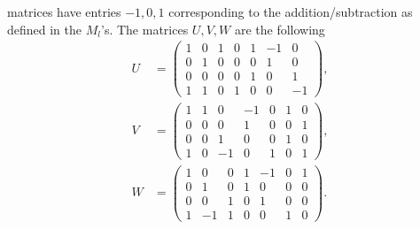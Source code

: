\documentclass[a4paper]{article}
\begin{document}
matrices have entries $-1, 0, 1$ corresponding to the addition/subtraction as
defined in the $M_l$'s. The matrices $U, V, W$ are the following
\begin{align}
    U &=
    \begin{pmatrix}
        1 & 0 & 1 & 0 & 1 & -1 & 0 \\
        0 & 1 & 0 & 0 & 0 & 1 & 0 \\
        0 & 0 & 0 & 0 & 1 & 0 & 1 \\
        1 & 1 & 0 & 1 & 0 & 0 & -1
    \end{pmatrix},\\
    V &=
    \begin{pmatrix}
        1 & 1 & 0 & -1 & 0 & 1 & 0\\
        0 & 0 & 0 & 1 & 0 & 0 & 1\\
        0 & 0 & 1 & 0 & 0 & 1 & 0\\
        1 & 0 & -1 & 0 & 1 & 0 & 1
    \end{pmatrix},\\
    W &=
    \begin{pmatrix}
        1 & 0 & 0 & 1 & -1 & 0 & 1\\
        0 & 1 & 0 & 1 & 0 & 0 & 0\\
        0 & 0 & 1 & 0 & 1 & 0 & 0\\
        1 & -1 & 1 & 0 & 0 & 1 & 0
    \end{pmatrix}.
\end{align}
\nocite{code}
\end{document}
